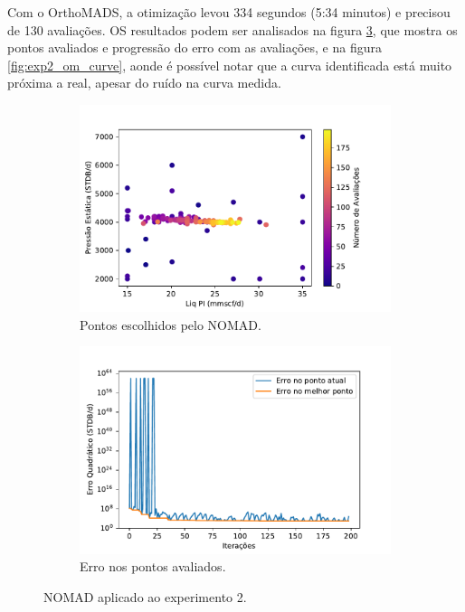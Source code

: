 Com o OrthoMADS, a otimização levou 334 segundos (5:34 minutos) e precisou de 130 avaliações. OS resultados podem ser analisados na figura \ref{fig:exp2_om}, que mostra os pontos avaliados e progressão do erro com as avaliações, e na figura \ref{fig:exp2_om_curve}, aonde é possível notar que a curva identificada está muito próxima a real, apesar do ruído na curva medida. 




\begin{figure}
\centering
\begin{subfigure}{0.5\textwidth}
  \centering
  \includegraphics[width=1\linewidth]{figs/setup2_om_points.pdf}
  \caption{Pontos escolhidos pelo NOMAD.}
  \label{fig:exp2_om_points}
\end{subfigure}%
\begin{subfigure}{0.5\textwidth}
  \centering
  \includegraphics[width=1\linewidth]{figs/setup2_om_errors.pdf}
  \caption{Erro nos pontos avaliados.}
  \label{fig:exp2_om_error}
\end{subfigure}
\caption{NOMAD aplicado ao experimento 2.}
\label{fig:exp2_om}
\end{figure}





